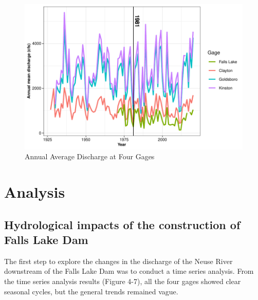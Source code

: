 \documentclass[
  12pt,
]{article}
\begin{document}
\begin{figure}

\includegraphics{Gardner_Zeng_ENV872_Project_files/figure-latex/Plot annual mean discharge-1} \hfill{}

\caption{Annual Average Discharge at Four Gages}\label{fig:Plot annual mean discharge}
\end{figure}

\hypertarget{analysis}{%
\section{Analysis}\label{analysis}}

\hypertarget{hydrological-impacts-of-the-construction-of-falls-lake-dam}{%
\subsection{Hydrological impacts of the construction of Falls Lake
Dam}\label{hydrological-impacts-of-the-construction-of-falls-lake-dam}}

The first step to explore the changes in the discharge of the Neuse
River downstream of the Falls Lake Dam was to conduct a time series
analysis. From the time series analysis results (Figure 4-7), all the
four gages showed clear seasonal cycles, but the general trends remained
vague.
\end{document}
